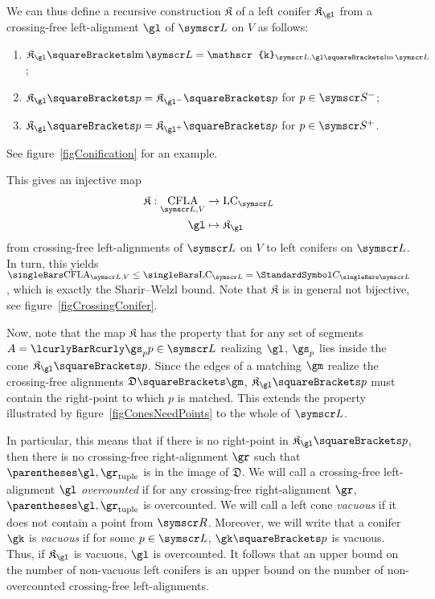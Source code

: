 \documentclass[10pt, a4paper, twoside]{basestyle}
\DeclareMathOperator{\CFLA}{CFLA}
\DeclareMathOperator{\leftmost}{lm}
\newcommand{\LC}[1]{\mathrm{LC}_{#1}}
\newcommand{\CatalanNumber}[1]{\StandardSymbol C_{#1}}
\newcommand{\pointset}{\symscr}
\newcommand{\lcone}[1]{\mathscr{k}_{\pointset L, #1}}
\newcommand{\conification}{\mathfrak{K}}
\newcommand{\decomposition}{\mathfrak{D}}
\begin{document}
We can thus define a recursive construction $\conification$ of a left conifer $\conification_\gl$ from
a crossing-free left-alignment $\gl$ of $\pointset L$ on $V$ as follows:
\begin{enumerate}
\item $\conification_\gl\of{\leftmost\pointset L}=\lcone{\gl\of{\leftmost\pointset L}}$;
\item $\conification_\gl\of{p}=\conification_{\gl^-}\of{p}$ for $p\in\pointset S^-$;
\item $\conification_\gl\of{p}=\conification_{\gl^+}\of{p}$ for $p\in\pointset S^+$.
\end{enumerate}
See figure~\ref{figConification} for an example.

This gives an injective map\[
\FunctionDefinition {\conification} {\CFLA_{\pointset L, V}} {\LC {\pointset L}} {\gl} {\conification_\gl}
\]
from crossing-free left-alignments of $\pointset L$ on $V$ to left conifers on $\pointset L$.
In turn, this yields $\Cardinality{\CFLA_{\pointset L, V}}\leq\Cardinality{\LC {\pointset L}}=
\CatalanNumber {\Cardinality{\pointset L}}$, which is exactly the
Sharir--Welzl bound.
Note that $\conification$ is in general not bijective, see figure~\ref{figCrossingConifer}.

Now, note that
the map $\conification$ has the property that for any set of segments $A=\setst{\gs_p}{p\in\pointset L}$ realizing $\gl$,
$\gs_p$ lies inside the cone $\conification_\gl\of{p}$. Since the edges of a matching $\gm$ realize the crossing-free
alignments $\decomposition\of{\gm}$, $\conification_\gl\of{p}$ must contain the right-point to which $p$ is matched.
This extends the property illustrated by figure~\ref{figConesNeedPoints} to the whole of $\pointset L$.

In particular, this means that if there is no right-point in $\conification_\gl\of{p}$,
then there is no crossing-free right-alignment $\gr$ such that $\tuple{\gl,\gr}$ is in the image of $\decomposition$.
We will call a crossing-free left-alignment $\gl$ \emph{overcounted} if for any crossing-free right-alignment $\gr$,
$\tuple{\gl,\gr}$ is overcounted. We will call a left cone \emph{vacuous} if it does not contain a point
from $\pointset R$. 
Moreover, we will write that a conifer $\gk$ is \emph{vacuous} if for some $p\in\pointset L$,
$\gk\of{p}$ is vacuous. Thus, if $\conification_\gl$ is vacuous, $\gl$ is overcounted.
It follows that an upper bound on the number of non-vacuous left conifers is an upper bound on the number of non-overcounted
crossing-free left-alignments.
\end{document}
